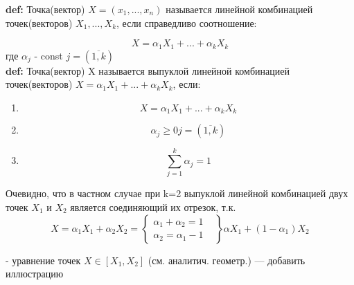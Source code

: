 \textbf{def:} Точка(вектор) $X = (x_1,...,x_n)$ называется линейной комбинацией точек(векторов) $X_1,...,X_k$, если справедливо соотношение:

\begin{equation}
X = \alpha_1 X_1 + ... + \alpha_k X_k
\end{equation} где $\alpha_j$ - const $j = (\overline{1,k})$ \\

\textbf{def:} Точка(вектор) X называется выпуклой линейной комбинацией точек(векторов) $X = \alpha_1 X_1 + ... + \alpha_k X_k$, если:

\begin{enumerate}
\item \begin{equation*}X = \alpha_1 X_1 + ... + \alpha_k X_k \end{equation*}
\item \begin{equation}\alpha_j \geq 0 j = (\overline{1,k}) \end{equation}
\item \begin{equation}\sum_{j=1}^{k}\alpha_j = 1 \end{equation} 
\end{enumerate}



Очевидно, что в частном случае при k=2 выпуклой линейной комбинацией двух точек $X_1$ и $X_2$ является соединяющий их отрезок, т.к. 
\[ 
X = \alpha_1 X_1 + \alpha_2 X_2 =  
    \left\{
        \begin{array}{lr} 
        \alpha_1 + \alpha_2 = 1 & \\ 
        \alpha_2 = \alpha_1 - 1
        \end{array}
    \right\}
\alpha X_1 + (1-\alpha_1)X_2
\]

- уравнение точек $X \in [X_1, X_2]$ (см. аналитич. геометр.)
--- добавить иллюстрацию

